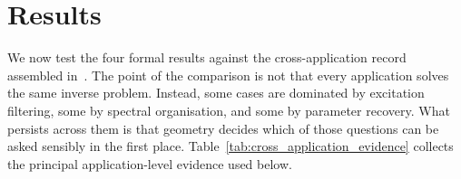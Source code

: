 
\section{Results}
\label{sec:results}

We now test the four formal results against the cross-application record assembled
in~\cite{BrowntoneP1,BrowntoneP4,BrowntoneP5,BrowntoneP7,BrowntoneP8}.  The point of the comparison is not that every
application solves the same inverse problem.  Instead, some cases
are dominated by excitation filtering, some by spectral organisation, and some
by parameter recovery.  What persists across them is that geometry decides which
of those questions can be asked sensibly in the first place.
Table~\ref{tab:cross_application_evidence} collects the principal
application-level evidence used below.

